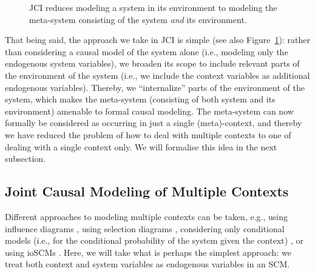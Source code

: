 \documentclass[twoside,11pt]{article}
\begin{document}
\begin{figure}\centering
{}
  \caption{JCI reduces modeling a system in its environment to modeling the meta-system consisting of the system \emph{and} its environment.\label{fig:JCI_key_idea}}
\end{figure}

That being said, the approach we take in JCI is simple (see also Figure~\ref{fig:JCI_key_idea}): rather than considering a causal model of the system alone (i.e., modeling only the
endogenous system variables), we broaden its
scope to include relevant parts of the environment of the system (i.e., we include the context variables as
additional endogenous variables).
Thereby, we ``internalize'' parts of the environment of the system, 
which makes the meta-system (consisting of both system and its environment) amenable to formal causal modeling.
The meta-system can now formally be considered as occurring in just a single (meta)-context, and thereby we
have reduced the problem of how to deal with multiple contexts to one of dealing with a single context only.
We will formalise this idea in the next subsection.

\subsection{Joint Causal Modeling of Multiple Contexts}\label{sec:JCI_modeling}

Different approaches to modeling multiple contexts can be taken, e.g., using
influence diagrams \citep{Dawid2002}, using selection diagrams \citep{BareinboimPearl2013},
considering only conditional models (i.e., for the conditional probability of the system
given the context) \citep{EatonMurphy07,MooijHeskes_UAI_13}, or using ioSCMs 
\citep{ForreMooij_UAI_19}. Here, we will take what is perhaps the simplest
approach: we treat both context and system variables as endogenous variables in an SCM.
\end{document}

